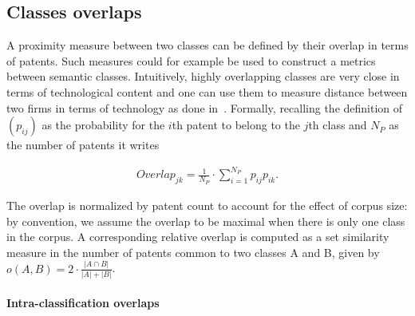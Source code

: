 \documentclass[article]{article}%
\begin{document}
\subsection{Classes overlaps} \label{subsec:overlaps}

A proximity measure between two classes can be defined by their overlap in terms of patents. 
Such measures could for example be used to construct a metrics between semantic classes. Intuitively, highly overlapping classes are very close in terms of technological content and one can use them to measure distance between two firms in terms of technology as done in~\cite{bloom2013}. Formally, recalling the definition of $\left(p_{ij}\right)$ as the probability for the $i$th patent to belong to the $j$th class and $N_P$ as the number of patents it writes 

\begin{eqnarray}
\label{overlap}
Overlap_{jk} = \frac{1}{N_P}\cdot \sum_{i=1}^{N_P} p_{ij} p_{ik}. 
\end{eqnarray}

The overlap is normalized by patent count to account for the effect of corpus size: by convention, we assume the overlap to be maximal when there is only one class in the corpus. A corresponding relative overlap is computed as a set similarity measure in the number of patents common to two classes A and B, given by $o(A,B)=2\cdot \frac{\left|A\cap B\right|}{\left|A\right| + \left|B\right|}$.


\paragraph{Intra-classification overlaps}
\end{document}
